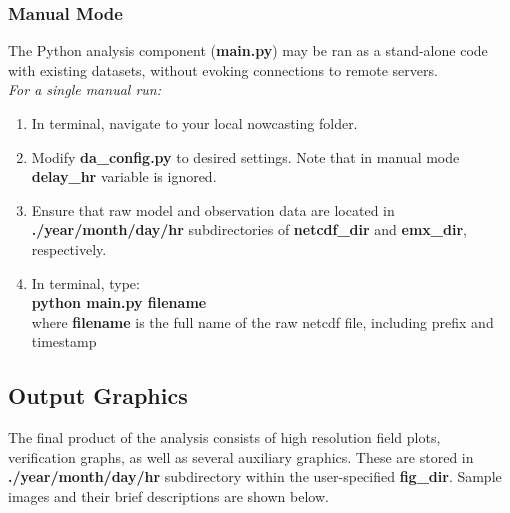 \documentclass{article}
\begin{document}
\subsubsection{Manual Mode}
The Python analysis component (\textbf{main.py}) may be ran as a stand-alone code with existing datasets, without evoking connections to remote servers. \\

\noindent \emph{For a single manual run:} \\
\begin{enumerate}[1.]
\item In terminal, navigate to your local nowcasting folder. 
\item Modify \textbf{da\_config.py} to desired settings. Note that in manual mode \textbf{delay\_hr} variable is ignored. 
\item Ensure that raw model and observation data are located in \textbf{./year/month/day/hr} subdirectories of \textbf{netcdf\_dir} and \textbf{emx\_dir}, respectively.
\item In terminal, type: \\
\textbf{python main.py filename}\\
 where \textbf{filename} is the full name of the raw netcdf file, including prefix and timestamp
\end{enumerate}

\subsection{Output Graphics}
\FloatBarrier
The final product of the analysis consists of high resolution field plots, verification graphs, as well as several auxiliary graphics. These are stored in  \textbf{./year/month/day/hr} subdirectory within the user-specified \textbf{fig\_dir}. Sample images and their brief descriptions are shown below. 
\end{document}
